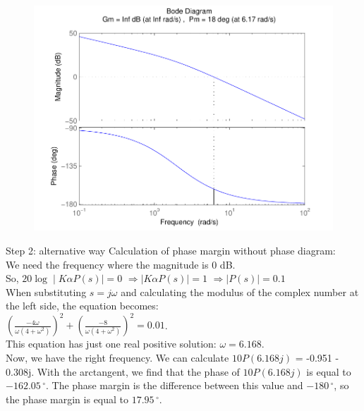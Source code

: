 \begin{frame}
	\begin{figure}
		\centering
		\includegraphics[width=0.7
		\linewidth]{leadstep1better}
	\end{figure}
\end{frame}

\begin{frame}
\begin{exampleblock}{Step 2: alternative way}
Calculation of phase margin without phase diagram: \\
We need the frequency where the magnitude is 0 dB. \\So, $20\log \mid K\alpha P(s) \mid = 0$
$\Rightarrow \mid K\alpha P(s) \mid = 1$
$\Rightarrow \mid P(s) \mid = 0.1$ \\
When substituting $s = j\omega$ and calculating the modulus of the complex number at the left side, the equation becomes: \\
\vspace{0.1 cm}
 $\left(\frac{-4\omega}{\omega \left( 4 + \omega^2\right)} \right) ^2 + \left( \frac{-8}{\omega \left( 4 + \omega^2 \right) }\right) ^2 = 0.01$. \\
\vspace{0.1 cm}
This equation has just one real positive solution: $\omega = 6.168$.\\
Now, we have the right frequency. We can calculate $10P(6.168j)$ = -0.951 - 0.308j. With the arctangent, we find that the phase of $10P(6.168j)$ is equal to $-162.05\,^{\circ}$. The phase margin is the difference between this value and $-180\,^{\circ}$, so the phase margin is equal to $17.95\,^{\circ}$.
\end{exampleblock}
\end{frame}

